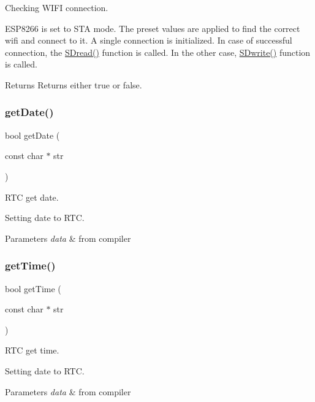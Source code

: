 Checking W\+I\+FI connection. 

E\+S\+P8266 is set to S\+TA mode. The preset values are applied to find the correct wifi and connect to it. A single connection is initialized. In case of successful connection, the \hyperlink{_w_s_8ino_ae25c95c757003a1f2daacee7dae07105}{S\+Dread()} function is called. In the other case, \hyperlink{_w_s_8ino_a5abc7cb0136096487b90a0a7001f1da6}{S\+Dwrite()} function is called. \begin{DoxyReturn}{Returns}
Returns either true or false. 
\end{DoxyReturn}
\mbox{\label{_w_s_8ino_a100af87d91fcaa6f23f2ca6a2fe146cc}} 
\subsubsection{\texorpdfstring{get\+Date()}{getDate()}}
{\footnotesize\ttfamily bool get\+Date (\begin{DoxyParamCaption}\item[{const char $\ast$}]{str }\end{DoxyParamCaption})}



R\+TC get date. 

Setting date to R\+TC. 
\begin{DoxyParams}{Parameters}
{\em data} & from compiler \\
\hline
\end{DoxyParams}
\mbox{\label{_w_s_8ino_ae96ca3df2e8b9eef75d400de6ef06db3}} 
\subsubsection{\texorpdfstring{get\+Time()}{getTime()}}
{\footnotesize\ttfamily bool get\+Time (\begin{DoxyParamCaption}\item[{const char $\ast$}]{str }\end{DoxyParamCaption})}



R\+TC get time. 

Setting date to R\+TC. 
\begin{DoxyParams}{Parameters}
{\em data} & from compiler \\
\hline
\end{DoxyParams}
\mbox{\label{_w_s_8ino_afe461d27b9c48d5921c00d521181f12f}} 
